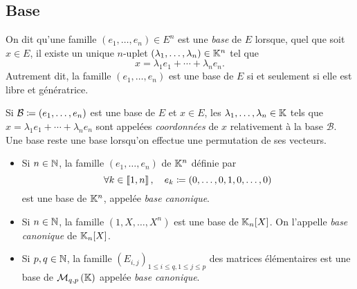 \documentclass{magnolia}
\begin{document}
\subsection{Base}

\begin{definition}[utile=-3]
On dit qu'une famille $(e_1,\ldots,e_n)\in E^n$ est une \emph{base} de $E$ lorsque,
quel que soit $x\in E$, il existe un unique $n$-uplet $\left(\lambda_1,\ldots,\lambda_n\right)\in\mathbb{K}^n$ tel que
\[x=\lambda_1 e_1+\cdots+\lambda_n e_n.\]
Autrement dit, la famille $(e_1,\ldots,e_n)$ est une base de $E$ si et seulement si elle est libre et génératrice.
\end{definition}

\begin{remarques}
\remarque Si $\mathcal{B}\coloneqq(e_1,\ldots,e_n)$ est une base de $E$ et $x\in E$, les
  $\lambda_1,\ldots,\lambda_n\in\mathbb{K}$ tels que $x=\lambda_1 e_1+\cdots+\lambda_n e_n$ sont appelées
  \emph{coordonnées} de $x$ relativement à la base $\mathcal{B}$.
\remarque[utile=-3] Une base reste une base lorsqu'on effectue une permutation de ses
  vecteurs.
\end{remarques}

\begin{definition}[utile=-3]
\begin{itemize}
\item Si $n\in\mathbb{N}$, la famille $(e_1,\ldots,e_n)$ de $\mathbb{K}^n$ définie par
  \[\forall k\in\left\llbracket 1,n\right\rrbracket ,\quad e_k\coloneqq \left(0,\ldots,0,1,0,\ldots,0\right)\]
  est une base de $\mathbb{K}^n$, appelée \emph{base canonique}.
\item Si $n\in\mathbb{N}$, la famille $(1,X,\ldots,X^n)$ est une base de $\polyK[n]$.
  On l'appelle \emph{base canonique} de $\polyK[n]$.
\item Si $p,q\in\mathbb{N}$, la famille $(E_{i,j})_{1\leq i\leq q, 1\leq j\leq p}$ des
  matrices élémentaires est une base de $\mathcal{M}_{q,p}\left(\mathbb{K}\right)$ appelée
  \emph{base canonique}.
\end{itemize}
\end{definition}

\end{document}
